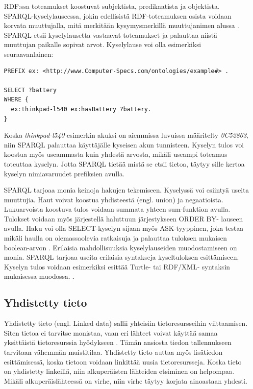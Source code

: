 \documentclass[finnish, 12pt, a4paper, elec, utf8, pdfa, online]{aaltothesis}
\begin{document}
{RDF:ssa toteamukset koostuvat subjektista, predikaatista ja objektista. SPARQL-kyselylauseessa, jokin edellisistä RDF-toteamuksen osista voidaan korvata muuttujalla, mitä merkitään kysymysmerkillä muuttujanimen alussa \cite{Antoniou}. SPARQL etsii kyselylausetta vastaavat toteamukset ja palauttaa niistä muuttujan paikalle sopivat arvot. Kyselylause voi olla esimerkiksi seuraavanlainen:

\begin{lstlisting}[style=codeblock]
PREFIX ex: <http://www.Computer-Specs.com/ontologies/example#> .

SELECT ?battery
WHERE {
  ex:thinkpad-l540 ex:hasBattery ?battery.
}
\end{lstlisting}

Koska \textit{thinkpad-l540} esimerkin akuksi on aiemmissa luvuissa määritelty \textit{0C52863}, niin SPARQL palauttaa käyttäjälle kyseisen akun tunnisteen. Kyselyn tulos voi koostua myös useammasta kuin yhdestä arvosta, mikäli useampi toteamus toteuttaa kyselyn. Jotta SPARQL tietää mistä se etsii tietoa, täytyy sille kertoa kyselyn nimiavaruudet prefiksien avulla.

SPARQL tarjoaa monia keinoja hakujen tekemiseen. Kyselyssä voi esiintyä useita muuttujia.
Haut voivat koostua yhdisteestä (engl. union) ja negaatioista. Lukuarvoista koostuva tulos voidaan summata yhteen sum-funktion avulla. Tulokset voidaan myös järjestellä haluttuun järjestykseen ORDER BY- lauseen avulla. Haku voi olla SELECT-kyselyn sijaan myös ASK-tyyppinen, joka testaa mikäli haulla on olemassaolevia ratkaisuja ja palauttaa tuloksen mukaisen boolean-arvon \cite{sparql_query}. Erilaisia mahdollisuuksia kyselylauseiden muodostamiseen on monia. SPARQL tarjoaa useita erilaisia syntakseja kyseltuloksen esittämiseen. Kyselyn tulos voidaan esimerkiksi esittää Turtle- tai RDF/XML- syntaksin mukaisessa muodossa. \cite{W3C_turtle}.


\clearpage

\subsection{Yhdistetty tieto}

Yhdistetty tieto (engl. Linked data) sallii yhteisiin tietoresursseihin viittaamisen. Siten tietoa ei tarvitse monistaa, vaan eri lähteet voivat käyttää samaa yksittäistä tietoresurssia hyödykseen \cite{linked_data_finlad}. Tämän ansiosta tiedon tallennukseen tarvitaan vähemmän muistitilaa. Yhdistetty tieto auttaa myös lisätiedon esittämisessä, koska tietoon voidaan linkittää uusia tietoresursseja. Koska tieto on yhdistetty linkeillä, niin alkuperäisten lähteiden etsiminen on helpompaa. Mikäli alkuperäislähteessä on virhe, niin virhe täytyy korjata ainoastaan yhdesti.


}
\end{document}
